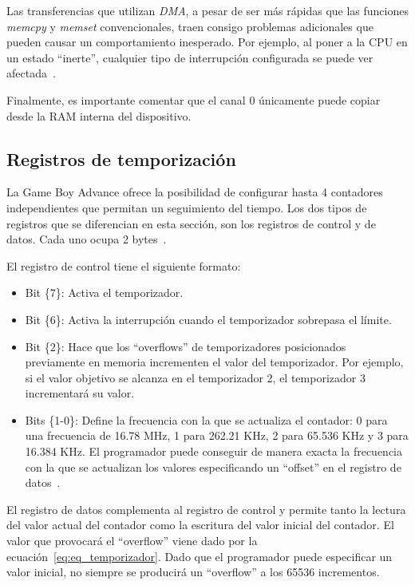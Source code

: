 Las transferencias que utilizan \textit{DMA}, a pesar de ser más rápidas que las funciones \textit{memcpy} y \textit{memset} convencionales, traen consigo problemas adicionales que pueden causar un comportamiento inesperado. Por ejemplo, al poner a la CPU en un estado ``inerte'', cualquier tipo de interrupción configurada se puede ver afectada~\cite{bib:tonc}.

Finalmente, es importante comentar que el canal 0 únicamente puede copiar desde la RAM interna del dispositivo.

\subsection{Registros de temporización}
La Game Boy Advance ofrece la posibilidad de configurar hasta 4 contadores independientes que permitan un seguimiento del tiempo. Los dos tipos de registros que se diferencian en esta sección, son los registros de control y de datos. Cada uno ocupa 2 bytes~\cite{bib:tonc}. 

El registro de control tiene el siguiente formato:

\begin{itemize}
	\item Bit \{7\}: Activa el temporizador.
	\item Bit \{6\}: Activa la interrupción cuando el temporizador sobrepasa el límite. 
	\item Bit \{2\}: Hace que los ``overflows'' de temporizadores posicionados previamente en memoria incrementen el valor del temporizador. Por ejemplo, si el valor objetivo se alcanza en el temporizador 2, el temporizador 3 incrementará su valor. 
	\item Bits \{1-0\}: Define la frecuencia con la que se actualiza el contador: 0 para una frecuencia de 16.78 MHz, 1 para 262.21 KHz, 2 para 65.536 KHz y 3 para 16.384 KHz. El programador puede conseguir de manera exacta la frecuencia con la que se actualizan los valores especificando un ``offset'' en el registro de datos~\cite{bib:tonc}.
\end{itemize}

El registro de datos complementa al registro de control y permite tanto la lectura del valor actual del contador como la escritura del valor inicial del contador. El valor que provocará el ``overflow'' viene dado por la ecuación~\ref{eq:eq_temporizador}. Dado que el programador puede especificar un valor inicial, no siempre se producirá un ``overflow'' a los 65536 incrementos.

